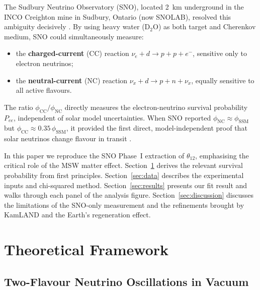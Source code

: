 \documentclass[12pt, a4paper]{article}
\begin{document}
The Sudbury Neutrino Observatory (SNO), located 2~km underground in the
INCO Creighton mine in Sudbury, Ontario (now SNOLAB), resolved this ambiguity
decisively \cite{SNO2002}.
By using heavy water ($\text{D}_2\text{O}$) as both target and Cherenkov
medium, SNO could simultaneously measure:
\begin{itemize}
    \item the \textbf{charged-current} (CC) reaction
          $\nu_e + d \to p + p + e^-$,
          sensitive only to electron neutrinos;
    \item the \textbf{neutral-current} (NC) reaction
          $\nu_x + d \to p + n + \nu_x$,
          equally sensitive to all active flavours.
\end{itemize}
The ratio $\phi_\text{CC}/\phi_\text{NC}$ directly measures the
electron-neutrino survival probability $P_{ee}$, independent of solar model
uncertainties.
When SNO reported $\phi_\text{NC} \approx \phi_\text{SSM}$ but
$\phi_\text{CC} \approx 0.35\,\phi_\text{SSM}$, it provided the first
direct, model-independent proof that solar neutrinos change flavour
in transit \cite{SNO2002}.
 
In this paper we reproduce the SNO Phase~I extraction of $\theta_{12}$,
emphasising the critical role of the MSW matter effect.
Section~\ref{sec:theory} derives the relevant survival probability from
first principles.
Section~\ref{sec:data} describes the experimental inputs and chi-squared
method.
Section~\ref{sec:results} presents our fit result and walks through each
panel of the analysis figure.
Section~\ref{sec:discussion} discusses the limitations of the SNO-only
measurement and the refinements brought by KamLAND and the Earth's
regeneration effect.
 
\section{Theoretical Framework}
\label{sec:theory}
 
\subsection{Two-Flavour Neutrino Oscillations in Vacuum}
 
\end{document}
